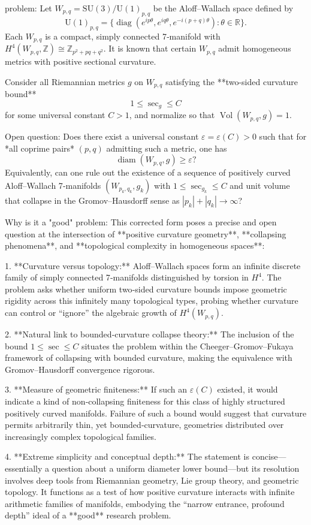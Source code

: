 problem:  
Let \( W_{p,q} = \mathrm{SU}(3)/\mathrm{U}(1)_{p,q} \) be the Aloff–Wallach space defined by  
\[
\mathrm{U}(1)_{p,q} = \{ \operatorname{diag}(e^{ip\theta}, e^{iq\theta}, e^{-i(p+q)\theta}) : \theta \in \mathbb{R} \}.
\]  
Each \(W_{p,q}\) is a compact, simply connected 7‑manifold with \(H^4(W_{p,q},\mathbb{Z}) \cong \mathbb{Z}_{p^2 + pq + q^2}\).  
It is known that certain \(W_{p,q}\) admit homogeneous metrics with positive sectional curvature.  

Consider all Riemannian metrics \(g\) on \(W_{p,q}\) satisfying the **two-sided curvature bound**
\[
1 \le \sec_g \le C
\]
for some universal constant \(C>1\), and normalize so that \(\operatorname{Vol}(W_{p,q},g)=1\).  

Open question:  
Does there exist a universal constant \(\varepsilon = \varepsilon(C) > 0\) such that for *all coprime pairs* \((p,q)\) admitting such a metric, one has  
\[
\operatorname{diam}(W_{p,q}, g) \ge \varepsilon?
\]  
Equivalently, can one rule out the existence of a sequence of positively curved Aloff–Wallach 7‑manifolds \((W_{p_k,q_k}, g_k)\) with \(1 \le \sec_{g_k}\le C\) and unit volume that collapse in the Gromov–Hausdorff sense as \(|p_k|+|q_k| \to \infty\)?

Why is it a "good" problem:  
This corrected form poses a precise and open question at the intersection of **positive curvature geometry**, **collapsing phenomena**, and **topological complexity in homogeneous spaces**:

1. **Curvature versus topology:** Aloff–Wallach spaces form an infinite discrete family of simply connected 7‑manifolds distinguished by torsion in \(H^4\). The problem asks whether uniform two‑sided curvature bounds impose geometric rigidity across this infinitely many topological types, probing whether curvature can control or “ignore” the algebraic growth of \(H^4(W_{p,q})\).

2. **Natural link to bounded‑curvature collapse theory:** The inclusion of the bound \(1 \le \sec \le C\) situates the problem within the Cheeger–Gromov–Fukaya framework of collapsing with bounded curvature, making the equivalence with Gromov–Hausdorff convergence rigorous.

3. **Measure of geometric finiteness:** If such an \(\varepsilon(C)\) existed, it would indicate a kind of non‑collapsing finiteness for this class of highly structured positively curved manifolds. Failure of such a bound would suggest that curvature permits arbitrarily thin, yet bounded‑curvature, geometries distributed over increasingly complex topological families.

4. **Extreme simplicity and conceptual depth:** The statement is concise—essentially a question about a uniform diameter lower bound—but its resolution involves deep tools from Riemannian geometry, Lie group theory, and geometric topology. It functions as a test of how positive curvature interacts with infinite arithmetic families of manifolds, embodying the “narrow entrance, profound depth” ideal of a **good** research problem.
